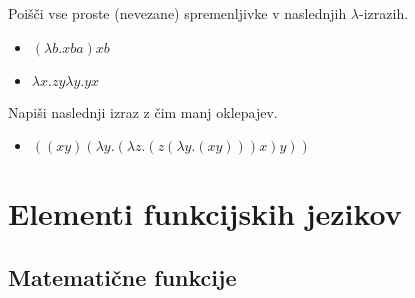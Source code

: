 \begin{ex}
Poi\v s\v ci vse proste (nevezane) spremenljivke v naslednjih $\lambda$-izrazih. 
\begin{itemize}
\item $(\lambda b.xba)xb$ 
\item $\lambda x.zy\lambda y.yx $
\end{itemize}
\end{ex}
\begin{ex}
Napi\v si naslednji izraz z \v cim manj oklepajev. 

 \begin{itemize}
 \item $((xy)(\lambda y.(\lambda z.(z(\lambda y.(xy)))x)y)) $
 \end{itemize}


\end{ex} 


\chapter{Elementi funkcijskih jezikov}

\section{Matemati\v cne funkcije}


